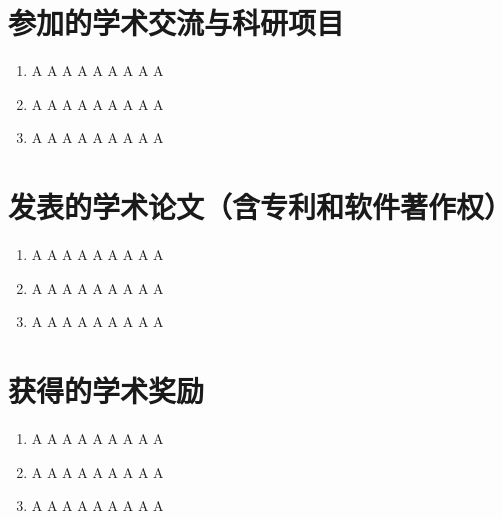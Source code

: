 
\begin{publications}

\section{参加的学术交流与科研项目}

\begin{enumerate}
\item A A A A A A A A A
\item A A A A A A A A A
\item A A A A A A A A A
\end{enumerate}

\section{发表的学术论文（含专利和软件著作权）}

\begin{enumerate}
\item A A A A A A A A A
\item A A A A A A A A A
\item A A A A A A A A A
\end{enumerate}

\section{获得的学术奖励}
\begin{enumerate}
\item A A A A A A A A A
\item A A A A A A A A A
\item A A A A A A A A A
\end{enumerate}

\end{publications}
